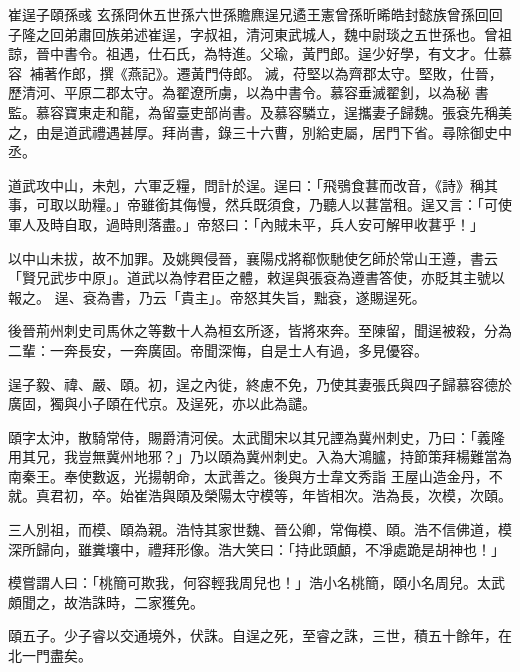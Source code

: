 
\begin{pinyinscope}

 崔逞子頤孫彧
 玄孫冏休五世孫六世孫贍麃逞兄遹王憲曾孫昕晞皓封懿族曾孫回回子隆之回弟肅回族弟述崔逞，字叔祖，清河東武城人，魏中尉琰之五世孫也。曾祖諒，晉中書令。祖遇，仕石氏，為特進。父瑜，黃門郎。逞少好學，有文才。仕慕容，補著作郎，撰《燕記》。遷黃門侍郎。滅，苻堅以為齊郡太守。堅敗，仕晉，歷清河、平原二郡太守。為翟遼所虜，以為中書令。慕容垂滅翟釗，以為秘
 書監。慕容寶東走和龍，為留臺吏部尚書。及慕容驎立，逞攜妻子歸魏。張袞先稱美之，由是道武禮遇甚厚。拜尚書，錄三十六曹，別給吏屬，居門下省。尋除御史中丞。



 道武攻中山，未剋，六軍乏糧，問計於逞。逞曰：「飛鴞食葚而改音，《詩》稱其事，可取以助糧。」帝雖銜其侮慢，然兵既須食，乃聽人以葚當租。逞又言：「可使軍人及時自取，過時則落盡。」帝怒曰：「內賊未平，兵人安可解甲收葚乎！」



 以中山未拔，故不加罪。及姚興侵晉，襄陽戍將郗恢馳使乞師於常山王遵，書云「賢兄武步中原」。道武以為悖君臣之體，敕逞與張袞為遵書答使，亦貶其主號以報之。
 逞、袞為書，乃云「貴主」。帝怒其失旨，黜袞，遂賜逞死。



 後晉荊州刺史司馬休之等數十人為桓玄所逐，皆將來奔。至陳留，聞逞被殺，分為二輩：一奔長安，一奔廣固。帝聞深悔，自是士人有過，多見優容。



 逞子毅、禕、嚴、頤。初，逞之內徙，終慮不免，乃使其妻張氏與四子歸慕容德於廣固，獨與小子頤在代京。及逞死，亦以此為譴。



 頤字太沖，散騎常侍，賜爵清河侯。太武聞宋以其兄諲為冀州刺史，乃曰：「義隆用其兄，我豈無冀州地邪？」乃以頤為冀州刺史。入為大鴻臚，持節策拜楊難當為南秦王。奉使數返，光揚朝命，太武善之。後與方士韋文秀詣
 王屋山造金丹，不就。真君初，卒。始崔浩與頤及榮陽太守模等，年皆相次。浩為長，次模，次頤。



 三人別祖，而模、頤為親。浩恃其家世魏、晉公卿，常侮模、頤。浩不信佛道，模深所歸向，雖糞壤中，禮拜形像。浩大笑曰：「持此頭顱，不凈處跪是胡神也！」



 模嘗謂人曰：「桃簡可欺我，何容輕我周兒也！」浩小名桃簡，頤小名周兒。太武頗聞之，故浩誅時，二家獲免。



 頤五子。少子睿以交通境外，伏誅。自逞之死，至睿之誅，三世，積五十餘年，在北一門盡矣。




\end{pinyinscope}
